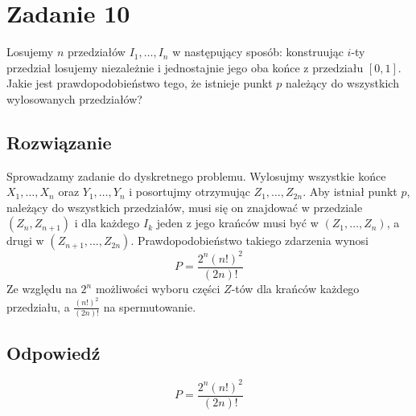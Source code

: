 \section{Zadanie 10}
Losujemy \(n\) przedziałów \(I_1, \dots, I_n\) w następujący sposób: konstruując \(i\)-ty przedział losujemy niezależnie i jednostajnie jego oba końce z przedziału \([0, 1]\). Jakie jest prawdopodobieństwo tego, że istnieje punkt \(p\) należący do wszystkich wylosowanych przedziałów?


\subsection*{Rozwiązanie}
Sprowadzamy zadanie do dyskretnego problemu. Wylosujmy wszystkie końce \(X_1,\dots,X_n\) oraz \(Y_1,\dots,Y_n\) i posortujmy otrzymując \(Z_1,\dots,Z_{2n}\). Aby istniał punkt \(p\), należący do wszystkich przedziałów, musi się on znajdować w przedziale \((Z_n,Z_{n+1})\) i dla każdego \(I_k\) jeden z jego krańców musi być w \((Z_1,\dots,Z_n)\), a drugi w \((Z_{n+1},\dots,Z_{2n})\). Prawdopodobieństwo takiego zdarzenia wynosi
\[
	P = \frac{2^n (n!)^2}{(2n)!}
\]
Ze względu na \(2^n\) możliwości wyboru części \(Z\)-tów dla krańców każdego przedziału, a \(\frac{(n!)^2}{(2n)!}\) na spermutowanie.
\subsection*{Odpowiedź}
\[
	\boxed{{P = \frac{2^n (n!)^2}{(2n)!}}}
\]
